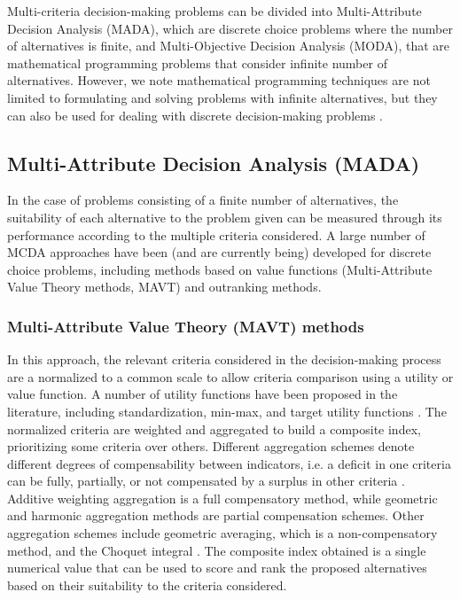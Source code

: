 \begin{refsection}[referencesCh1]
Multi-criteria decision-making problems can be divided into Multi-Attribute Decision Analysis (MADA), which are discrete choice problems where the number of alternatives is finite, and Multi-Objective Decision Analysis (MODA), that are mathematical programming problems that consider infinite number of alternatives. However, we note mathematical programming techniques are not limited to formulating and solving problems with infinite alternatives, but they can also be used for dealing with discrete decision-making problems \citep{giove2009decision}. {\color{red}{figure?}}

\subsection{Multi-Attribute Decision Analysis (MADA)}

In the case of problems consisting of a finite number of alternatives, the suitability of each alternative to the problem given can be measured through its performance according to the multiple criteria considered. A large number of MCDA approaches have been (and are currently being) developed for discrete choice problems, including methods based on value functions (Multi-Attribute Value Theory methods, MAVT) and outranking methods.

\subsubsection{Multi-Attribute Value Theory (MAVT) methods}
In this approach, the relevant criteria considered in the decision-making process are a normalized to a common scale to allow criteria comparison using a utility or value function. A number of utility functions have been proposed in the literature, including standardization, min-max, and target utility functions \citep{HandbookCompositeIndicators}. 
The normalized criteria 
are weighted and aggregated to build a composite index, prioritizing some criteria over others. Different aggregation schemes denote different degrees of compensability between indicators, i.e. a deficit in one criteria can be fully, partially, or not compensated by a surplus in other criteria \citep{MarcoCinelli2020}. Additive weighting aggregation is a full compensatory method, while geometric and  harmonic aggregation methods are partial  compensation schemes. Other aggregation schemes include geometric averaging, which is a non-compensatory method, and the Choquet integral \citep{marichal2000determination}. The composite index obtained is a single numerical value that can be used to score and rank the proposed alternatives based on their suitability to the criteria considered. 


\end{refsection}
